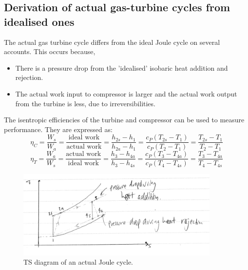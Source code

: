 \documentclass[class=report, crop=false, 12pt,a4paper]{standalone}
\begin{document}
\subsection{Derivation of actual gas-turbine cycles from idealised ones}
The actual gas turbine cycle differs from the ideal Joule cycle on several accounts. This occurs because,
\begin{itemize}[noitemsep]
  \item There is a pressure drop from the 'idealised' isobaric heat addition and rejection.
  \item The actual work input to compressor is larger and the actual work output from the turbine is less, due to irreversibilities.
\end{itemize}
The isentropic efficiencies of the turbine and compressor can be used to measure performance. They are expressed as:
\begin{equation}
  \eta_C = \frac{W_s}{W_a} = \frac{\textrm{ideal work}}{\textrm{actual work}} = \frac{h_{2s} - h_1}{h_{2a} - h_1} = \frac{c_P (T_{2s} - T_1)}{c_P (T_2 -T_1)} = \frac{T_{2s} - T_1}{T_2 - T_1}
\end{equation}
\begin{equation}
  \eta_T = \frac{W_a}{W_s} = \frac{\textrm{actual work}}{\textrm{ideal work}} = \frac{h_{3} - h_{4a}}{h_{3} - h_{4s}} = \frac{c_P (T_{3} - T_{4a})}{c_P (T_4 -T_{4s})} = \frac{T_{3} - T_{4a}}{T_4 - T_{4s}}
\end{equation}
\begin{figure}
  \centering
  \includegraphics[width = 0.9\textwidth]{../img/efficienciesOfActualJouleCycles}
  \caption{TS diagram of an actual Joule cycle.}
\end{figure}
\end{document}
